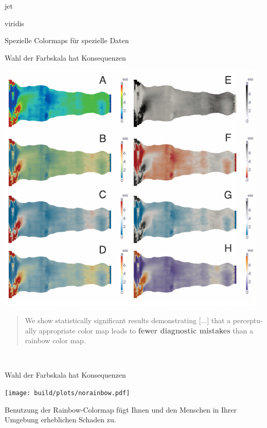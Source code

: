 \documentclass[aspectratio=1610, 9pt]{beamer}
\begin{document}
\begin{frame}[plain]{jet}
\end{frame}

\begin{frame}[plain]{viridis}
\end{frame}


\begin{frame}{Spezielle Colormaps für spezielle Daten}%
\end{frame}%


\begin{frame}[t]{Wahl der Farbskala hat Konsequenzen}
  \begin{center}
    \includegraphics[height=0.7\textheight]{images/heartdisease.pdf}
  \end{center}

  \leavevmode
  \foreignblockquote{english}{%
    We show statistically significant results demonstrating [...]
    that a perceptually appropriate color map
    leads to \textbf{fewer diagnostic mistakes} than a rainbow color map.%
  }\\[0.5\baselineskip]
  \small\cite{heartdisease}
\end{frame}


\begin{frame}[t]{Wahl der Farbskala hat Konsequenzen}  
  \centering

  \texttt{[image: build/plots/norainbow.pdf]}

  \begin{tcolorbox}[colframe=black, colback=white, fontupper=\raggedright\bfseries\zigarette, width=0.68\textwidth, boxrule=4pt, sharp corners]
    Benutzung der Rainbow-Colormap fügt Ihnen
    und den Menschen in Ihrer Umgebung erheblichen Schaden zu.
  \end{tcolorbox}
\end{frame}
\end{document}
